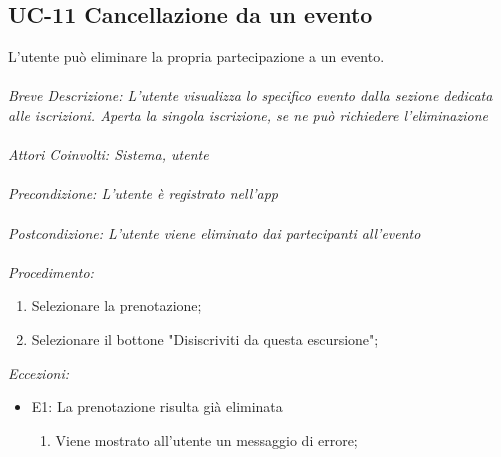 \subsection{UC-11 Cancellazione da un evento}
L'utente può eliminare la propria partecipazione a un evento.
\\
\\
\textit{Breve Descrizione: L'utente visualizza lo specifico evento dalla sezione dedicata alle iscrizioni. Aperta la singola iscrizione, se ne può richiedere l'eliminazione} 
\\
\\
\textit{Attori Coinvolti: Sistema, utente}
\\
\\
\textit{Precondizione: L'utente è registrato nell'app}
\\
\\
\textit{Postcondizione: L'utente viene eliminato dai partecipanti all'evento}
\\
\\
\textit{Procedimento:}
\begin{enumerate}
	\item Selezionare la prenotazione;
	\item Selezionare il bottone "Disiscriviti da questa escursione";
\end{enumerate}


\textit{Eccezioni:}
\begin{itemize}
	\item E1: La prenotazione risulta già eliminata
	\begin{enumerate}
		\item Viene mostrato all'utente un messaggio di errore;
	\end{enumerate}
\end{itemize}